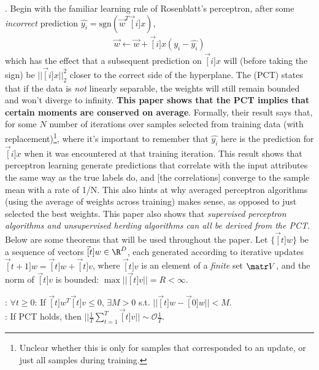 \documentclass[11pt]{article}
\begin{document}
\p {}. Begin with the familiar learning rule of Rosenblatt's perceptron, after some \textit{incorrect} prediction $\hat{y_i} = \text{sgn}(\vec{w}^T \vec[i]{x})$,
\begin{align}
\vec{w} \leftarrow \vec{w} + \vec[i]{x}(y_i - \hat{y_i})
\end{align}
which has the effect that a subsequent prediction on $\vec[i]{x}$ will (before taking the sign) be $||\vec[i]{x}||_2^2$ closer to the correct side of the hyperplane. The  (PCT) states that if the data is \textit{not} linearly separable, the weights will still remain bounded and won't diverge to infinity. \textbf{This paper shows that the PCT implies that certain moments are conserved on average}. Formally, their result says that, for some $N$ number of iterations over samples selected from training data (with replacement)\footnote{Unclear whether this is only for samples that corresponded to an update, or just all samples during training.},
where it's important to remember that $\hat{y_i}$ here is the prediction for $\vec[i]{x}$ when it was encountered at that training iteration. This result shows that perceptron learning generate predictions that correlate with the input attributes the same way as the true labels do, and [the correlations] converge to the sample mean with a rate of 1/N. This also hints at why averaged perceptron algorithms (using the average of weights across training) makes sense, as opposed to just selected the best weights. This paper also shows that \textit{supervised perceptron algorithms and unsupervised herding algorithms can all be derived from the PCT}. \\

Below are some theorems that will be used throughout the paper. Let $\{\vec[t]{w}\}$ be a sequence of vectors $\vec[t]{w} \in \R^{D}$, each generated according to iterative updates $\vec[t+1]{w} = \vec[t]{w} + \vec[t]{v}$, where $\vec[t]{v}$ is an element of a \textit{finite} set $\matr V$, and the norm of $\vec[t]{v}$ is bounded: $\max ||\vec[t]{v}|| = R < \infty$. 
\begin{definition}
	: $\forall t \ge 0$: If $\vec[t]{w}^T \vec[t]{v} \le 0$, $\exists M > 0$ s.t. $||\vec[t]{w} - \vec[0]{w}|| < M$. \\
	: If PCT holds, then $||\tfrac{1}{T} \sum_{t=1}^T \vec[t]{v} || \sim \mathcal{O}{\tfrac{1}{T}}$. 
\end{definition}
\end{document}
